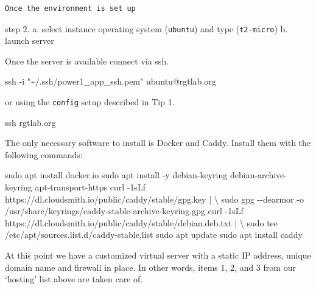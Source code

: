 \documentclass[
  letterpaper,
  DIV=11,
  numbers=noendperiod,
  oneside]{scrartcl}
\newenvironment{Shaded}{\begin{snugshade}}{\end{snugshade}}
\newcommand{\AttributeTok}[1]{\textcolor[rgb]{0.40,0.45,0.13}{#1}}
\newcommand{\DataTypeTok}[1]{\textcolor[rgb]{0.68,0.00,0.00}{#1}}
\newcommand{\ExtensionTok}[1]{\textcolor[rgb]{0.00,0.23,0.31}{#1}}
\newcommand{\FunctionTok}[1]{\textcolor[rgb]{0.28,0.35,0.67}{#1}}
\newcommand{\KeywordTok}[1]{\textcolor[rgb]{0.00,0.23,0.31}{#1}}
\newcommand{\NormalTok}[1]{\textcolor[rgb]{0.00,0.23,0.31}{#1}}
\newcommand{\StringTok}[1]{\textcolor[rgb]{0.13,0.47,0.30}{#1}}
\begin{document}
\begin{verbatim}
Once the environment is set up
\end{verbatim}

step 2. a. select instance operating system (\texttt{ubuntu}) and type
(\texttt{t2-micro}) b. launch server

Once the server is available connect via ssh.

\begin{Shaded}
\begin{Highlighting}[]
\FunctionTok{ssh} \AttributeTok{{-}i} \StringTok{"\textasciitilde{}/.ssh/power1\_app\_ssh.pem"}\NormalTok{  ubuntu@rgtlab.org}
\end{Highlighting}
\end{Shaded}

or using the \texttt{config} setup described in Tip 1.

\begin{Shaded}
\begin{Highlighting}[]
\FunctionTok{ssh}\NormalTok{ rgtlab.org }
\end{Highlighting}
\end{Shaded}

The only necessary software to install is Docker and Caddy. Install them
with the following commands:

\begin{Shaded}
\begin{Highlighting}[]
\FunctionTok{sudo}\NormalTok{ apt install docker.io}
\FunctionTok{sudo}\NormalTok{ apt install }\AttributeTok{{-}y}\NormalTok{ debian{-}keyring debian{-}archive{-}keyring apt{-}transport{-}https}
\ExtensionTok{curl} \AttributeTok{{-}1sLf} \StringTok{\textquotesingle{}https://dl.cloudsmith.io/public/caddy/stable/gpg.key\textquotesingle{}} \KeywordTok{|} \DataTypeTok{\textbackslash{}}
\FunctionTok{sudo}\NormalTok{ gpg }\AttributeTok{{-}{-}dearmor} \AttributeTok{{-}o}\NormalTok{ /usr/share/keyrings/caddy{-}stable{-}archive{-}keyring.gpg}
\ExtensionTok{curl} \AttributeTok{{-}1sLf} \StringTok{\textquotesingle{}https://dl.cloudsmith.io/public/caddy/stable/debian.deb.txt\textquotesingle{}} \KeywordTok{|} \DataTypeTok{\textbackslash{}}
\FunctionTok{sudo}\NormalTok{ tee /etc/apt/sources.list.d/caddy{-}stable.list}
\FunctionTok{sudo}\NormalTok{ apt update}
\FunctionTok{sudo}\NormalTok{ apt install caddy}
\end{Highlighting}
\end{Shaded}

At this point we have a customized virtual server with a static IP
address, unique domain name and firewall in place. In other words, items
1, 2, and 3 from our `hosting' list above are taken care of.
\end{document}
